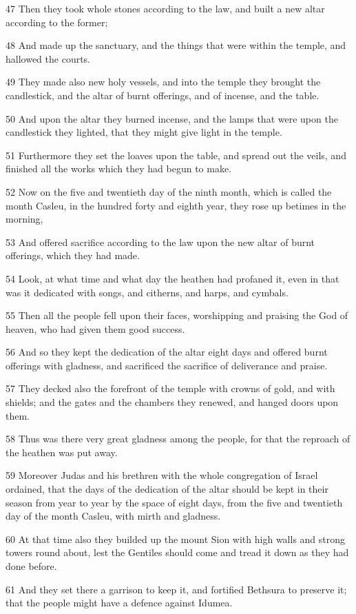 \par 47 Then they took whole stones according to the law, and built a new altar according to the former;
\par 48 And made up the sanctuary, and the things that were within the temple, and hallowed the courts.
\par 49 They made also new holy vessels, and into the temple they brought the candlestick, and the altar of burnt offerings, and of incense, and the table.
\par 50 And upon the altar they burned incense, and the lamps that were upon the candlestick they lighted, that they might give light in the temple.
\par 51 Furthermore they set the loaves upon the table, and spread out the veils, and finished all the works which they had begun to make.
\par 52 Now on the five and twentieth day of the ninth month, which is called the month Casleu, in the hundred forty and eighth year, they rose up betimes in the morning,
\par 53 And offered sacrifice according to the law upon the new altar of burnt offerings, which they had made.
\par 54 Look, at what time and what day the heathen had profaned it, even in that was it dedicated with songs, and citherns, and harps, and cymbals.
\par 55 Then all the people fell upon their faces, worshipping and praising the God of heaven, who had given them good success.
\par 56 And so they kept the dedication of the altar eight days and offered burnt offerings with gladness, and sacrificed the sacrifice of deliverance and praise.
\par 57 They decked also the forefront of the temple with crowns of gold, and with shields; and the gates and the chambers they renewed, and hanged doors upon them.
\par 58 Thus was there very great gladness among the people, for that the reproach of the heathen was put away.
\par 59 Moreover Judas and his brethren with the whole congregation of Israel ordained, that the days of the dedication of the altar should be kept in their season from year to year by the space of eight days, from the five and twentieth day of the month Casleu, with mirth and gladness.
\par 60 At that time also they builded up the mount Sion with high walls and strong towers round about, lest the Gentiles should come and tread it down as they had done before.
\par 61 And they set there a garrison to keep it, and fortified Bethsura to preserve it; that the people might have a defence against Idumea.

